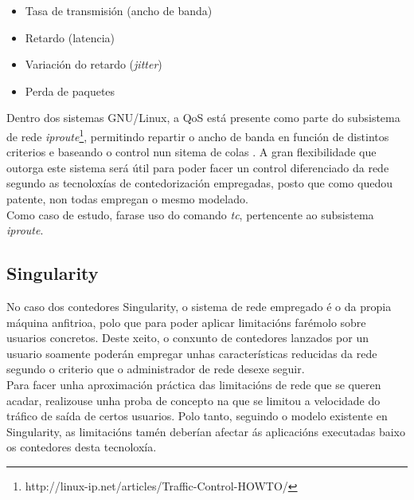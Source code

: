 \begin{itemize}
\item Tasa de transmisión (ancho de banda)
\item Retardo (latencia)
\item Variación do retardo (\textit{jitter})
\item Perda de paquetes
\end{itemize}

Dentro dos sistemas GNU/Linux, a QoS está presente como parte do subsistema de rede \textit{iproute}\footnote{http://linux-ip.net/articles/Traffic-Control-HOWTO/}, permitindo repartir o ancho de banda en función de distintos criterios e baseando o control nun sitema de colas \cite{practicasTecRedesQoS}. A gran flexibilidade que outorga este sistema será útil para poder facer un control diferenciado da rede segundo as tecnoloxías de contedorización empregadas, posto que como quedou patente, non todas empregan o mesmo modelado.\\

Como caso de estudo, farase uso do comando {\it tc}, pertencente ao subsistema \textit{iproute}.

\subsection{Singularity}

No caso dos contedores Singularity, o sistema de rede empregado é o da propia máquina anfitrioa, polo que para poder aplicar limitacións farémolo sobre usuarios concretos. Deste xeito, o conxunto de contedores lanzados por un usuario soamente poderán empregar unhas características reducidas da rede segundo o criterio que o administrador de rede desexe seguir.\\

Para facer unha aproximación práctica das limitacións de rede que se queren acadar, realizouse unha proba de concepto na que se limitou a velocidade do tráfico de saída de certos usuarios. Polo tanto, seguindo o modelo existente en Singularity, as limitacións tamén deberían afectar ás aplicacións executadas baixo os contedores desta tecnoloxía.\\

